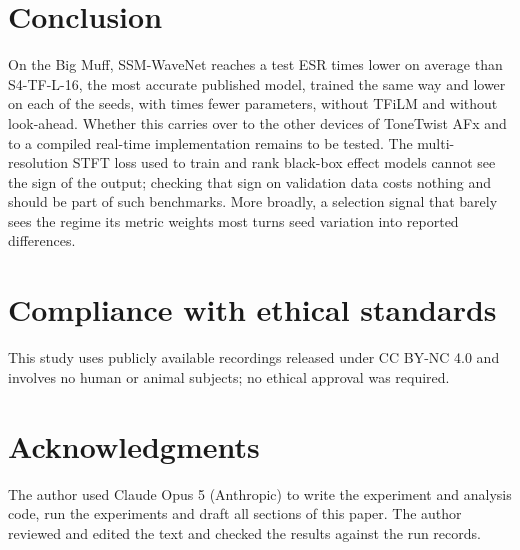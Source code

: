 \documentclass{article}
\begin{document}
\section{Conclusion}
\label{sec:conclusion}

On the Big Muff, SSM-WaveNet reaches a test ESR \SSMRatio{} times lower on
average than S4-TF-L-16, the most accurate published model, trained the same way
and lower on each of the \PairedSeeds{} seeds, with \ParamRatio{} times fewer
parameters, without TFiLM and without look-ahead. Whether this carries over to
the other devices of ToneTwist AFx and to a compiled real-time implementation
remains to be tested. The multi-resolution STFT loss used to
train and rank black-box effect models cannot see the sign of the output;
checking that sign on validation data costs nothing and should be part of such
benchmarks. More broadly, a selection signal that barely sees the regime its
metric weights most turns seed variation into reported differences.

\section{Compliance with ethical standards}
This study uses publicly available recordings released under CC BY-NC 4.0 and
involves no human or animal subjects; no ethical approval was required.

\section{Acknowledgments}
The author used Claude Opus 5 (Anthropic) to write the experiment and analysis
code, run the experiments and draft all sections of this paper. The author
reviewed and edited the text and checked the results against the run records.



\end{document}
